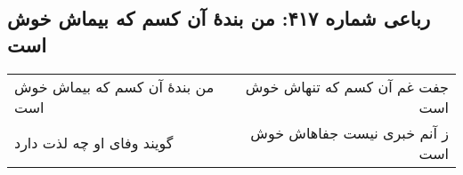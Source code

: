 \begin{center}
\section*{رباعی شماره ۴۱۷: من بندهٔ آن کسم که بیماش خوش است}
\label{sec:0417}
\begin{longtable}{l p{0.5cm} r}
من بندهٔ آن کسم که بیماش خوش است
&&
جفت غم آن کسم که تنهاش خوش است
\\
گویند وفای او چه لذت دارد
&&
ز آنم خبری نیست جفاهاش خوش است
\\
\end{longtable}
\end{center}
